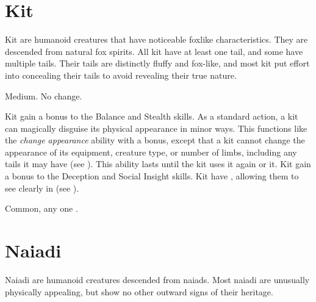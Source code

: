 \section{Kit}

    Kit are humanoid creatures that have noticeable foxlike characteristics.
    They are descended from natural fox spirits.
    All kit have at least one tail, and some have multiple tails.
    Their tails are distinctly fluffy and fox-like, and most kit put effort into concealing their tails to avoid revealing their true nature.

     Medium.
     No change.
    \begin{itemize}
         Kit gain a  bonus to the Balance and Stealth skills.
         As a standard action, a kit can magically disguise its physical appearance in minor ways.
            This functions like the \textit{change appearance} ability with a  bonus, except that a kit cannot change the appearance of its equipment, creature type, or number of limbs, including any tails it may have (see ).
            This ability lasts until the kit uses it again or  it.
         Kit gain a  bonus to the Deception and Social Insight skills.
         Kit have , allowing them to see clearly in  (see ).
    \end{itemize}
     Common, any one .

\section{Naiadi}
    Naiadi are humanoid creatures descended from naiads.
    Most naiadi are unusually physically appealing, but show no other outward signs of their heritage.

